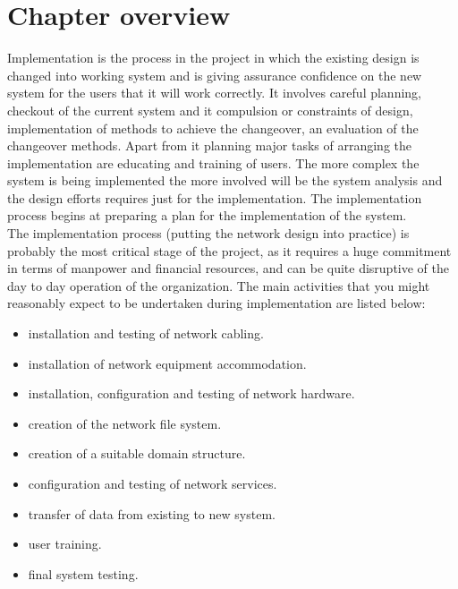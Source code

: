 \documentclass[12pt,a4paper]{report}
\newcommand\tab[1][0cm]{\hspace*{#1}}
\begin{document}
	\section{Chapter overview}
	\tab Implementation is the process in the project in which the existing design is changed
into working system and is giving assurance confidence on the new system for the users
that it will work correctly. It involves careful planning, checkout of the current system
and it compulsion or constraints of design, implementation of methods to achieve the
changeover, an evaluation of the changeover methods. Apart from it planning major tasks
of arranging the implementation are educating and training of users. The more complex
the system is being implemented the more involved will be the system analysis and the
design efforts requires just for the implementation. The implementation process begins at
preparing a plan for the implementation of the system.\\The implementation\cite{Ref:15} process (putting the network design into practice) is probably the most critical stage of the project, as it requires a huge commitment in terms of
manpower and financial resources, and can be quite disruptive of the day to day operation
of the organization. The main activities that you might reasonably expect to be undertaken
during implementation are listed below:
	\begin{itemize}
		\item installation and testing of network cabling.
		\item installation of network equipment accommodation.
		\item installation, configuration and testing of network hardware.
		\item creation of the network file system.
		\item creation of a suitable domain structure.
		\item configuration and testing of network services.
		\item transfer of data from existing to new system.
		\item user training.
		\item final system testing.
	\end{itemize}
\end{document}
